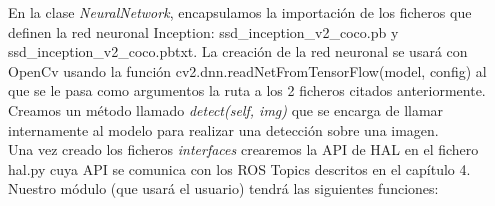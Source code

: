 En la clase \textit{NeuralNetwork}, encapsulamos la importación de los ficheros que definen la red neuronal Inception: ssd\_inception\_v2\_coco.pb y ssd\_inception\_v2\_coco.pbtxt. La creación de la red neuronal se usará con OpenCv usando la función cv2.dnn.readNetFromTensorFlow(model, config) al que se le pasa como argumentos la ruta a los 2 ficheros citados anteriormente. Creamos un método llamado \textit{detect(self, img)} que se encarga de llamar internamente al modelo para realizar una detección sobre una imagen.\\

Una vez creado los ficheros \textit{interfaces} crearemos la API de HAL en el fichero hal.py cuya API se comunica con los ROS Topics descritos en el capítulo 4. Nuestro módulo (que usará el usuario) tendrá las siguientes funciones:\\

